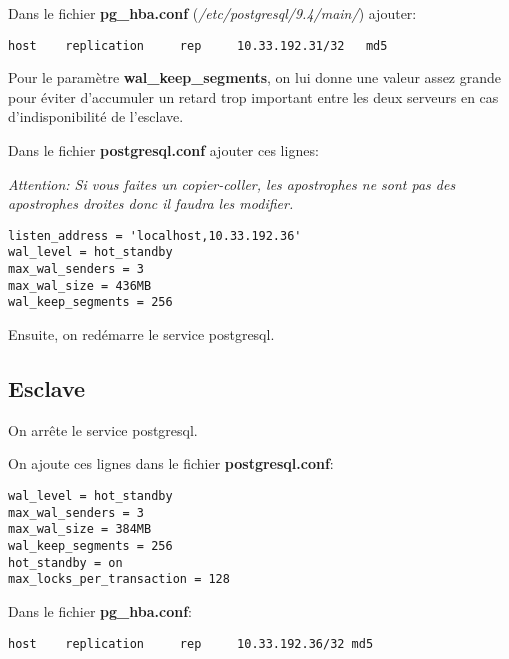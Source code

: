 \vspace{2mm}

Dans le fichier \textbf{pg\_hba.conf} (\textit{/etc/postgresql/9.4/main/}) ajouter:
\smallskip
\begin{Verbatim}[frame=single,framerule=1mm,framesep=3mm,rulecolor=\color{brown}]
host    replication     rep     10.33.192.31/32   md5
\end{Verbatim}

\vspace{2mm}

Pour le paramètre \textbf{wal\_keep\_segments}, on lui donne une valeur assez grande pour éviter d'accumuler un retard trop important entre les deux serveurs en cas d'indisponibilité de l'esclave.

Dans le fichier \textbf{postgresql.conf} ajouter ces lignes:

\textit{Attention: Si vous faites un copier-coller, les apostrophes ne sont pas des apostrophes droites donc il faudra les modifier.}
\smallskip
\begin{Verbatim}[frame=single,framerule=1mm,framesep=3mm,rulecolor=\color{brown}]
listen_address = 'localhost,10.33.192.36' 
wal_level = hot_standby 
max_wal_senders = 3 
max_wal_size = 436MB 
wal_keep_segments = 256 
\end{Verbatim}

Ensuite, on redémarre le service postgresql.

\vspace{2mm}

\subsection{\textcolor{Firebrick3}{\Large Esclave}}

On arrête le service postgresql.

\vspace{2mm}

On ajoute ces lignes dans le fichier \textbf{postgresql.conf}:
\smallskip
\begin{Verbatim}[frame=single,framerule=1mm,framesep=3mm,rulecolor=\color{brown}]
wal_level = hot_standby
max_wal_senders = 3
max_wal_size = 384MB
wal_keep_segments = 256
hot_standby = on
max_locks_per_transaction = 128
\end{Verbatim}

\vspace{2mm}

Dans le fichier \textbf{pg\_hba.conf}:
\smallskip
\begin{Verbatim}[frame=single,framerule=1mm,framesep=3mm,rulecolor=\color{brown}]
host    replication     rep     10.33.192.36/32 md5 
\end{Verbatim}

